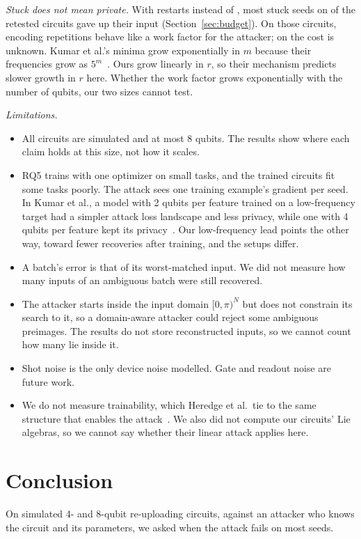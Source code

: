 \documentclass[10pt,conference]{IEEEtran}
\begin{document}
\emph{Stuck does not mean private.} With \BudgetRestarts{} restarts instead of \Restarts, most
stuck seeds on \BudgetOthersCount{} of the \BudgetCircuits{} retested circuits gave up their input
(Section~\ref{sec:budget}). On those circuits, encoding repetitions behave like a work factor for
the attacker; on \BudgetHardestCircuit{} the cost is unknown. Kumar et al.'s minima grow exponentially in $m$
because their frequencies grow as $5^m$~\cite{kumar2023}. Ours grow linearly in $r$, so their
mechanism predicts slower growth in $r$ here. Whether the work factor grows exponentially with the
number of qubits, our two sizes cannot test.

\emph{Limitations.}
\begin{itemize}
  \item All circuits are simulated and at most 8 qubits. The results show where each claim holds
  at this size, not how it scales.
  \item RQ5 trains with one optimizer on \TrainedTasks{} small tasks, and the trained circuits fit
  some tasks poorly. The attack sees one training example's gradient per seed. In Kumar et al.,
  a model with 2 qubits per feature trained on a low-frequency target had a simpler attack loss landscape
  and less privacy, while one with 4 qubits per feature kept its privacy~\cite{kumar2023}. Our low-frequency lead points the other way, toward fewer recoveries
  after training, and the setups differ.
  \item A batch's error is that of its worst-matched input. We did not measure how many inputs of
  an ambiguous batch were still recovered.
  \item The attacker starts inside the input domain $[0,\pi)^N$ but does not constrain its search
  to it, so a domain-aware attacker could reject some ambiguous preimages. The results do not store reconstructed inputs,
  so we cannot count how many lie inside it.
  \item Shot noise is the only device noise modelled. Gate and readout noise are future work.
  \item We do not measure trainability, which Heredge et al.\ tie to the same structure that
  enables the attack~\cite{heredge2025}. We also did not compute our circuits' Lie algebras, so we
  cannot say whether their linear attack applies here.
\end{itemize}

\section{Conclusion}
On simulated 4- and 8-qubit re-uploading circuits, against an attacker who knows the circuit and its
parameters, we asked when the attack fails on most seeds.
\end{document}
